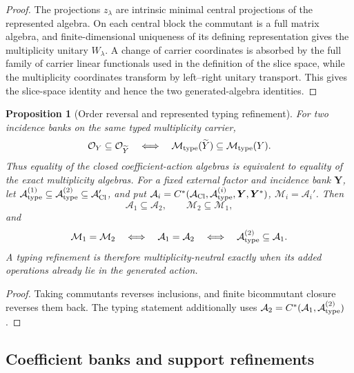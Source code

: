 \documentclass[11pt]{article}
\numberwithin{equation}{section}
\newtheorem{proposition}[theorem]{Proposition}
\theoremstyle{definition}
\theoremstyle{remark}
\newcommand{\A}{\mathcal A}
\newcommand{\M}{\mathcal M}
\newcommand{\Oalg}{\mathcal O}
\begin{document}
\begin{proof}
The projections $z_\lambda$ are intrinsic minimal central projections of the
represented algebra.  On each central block the commutant is a full matrix
algebra, and finite-dimensional uniqueness of its defining representation
gives the multiplicity unitary $W_\lambda$.  A change of carrier coordinates
is absorbed by the full family of carrier linear functionals used in the
definition of the slice space, while the multiplicity coordinates transform by
left--right unitary transport.  This gives the slice-space identity and hence
the two generated-algebra identities.
\end{proof}

\begin{proposition}[Order reversal and represented typing refinement]
\label{prop:typing-refinement}
For two incidence banks on the same typed multiplicity carrier,
\begin{equation}
 \Oalg_Y\subseteq\Oalg_{\widetilde Y}
 \quad\Longleftrightarrow\quad
 \M_{\rm type}(\widetilde Y)\subseteq\M_{\rm type}(Y).
 \label{eq:incidence-closure-galois}
\end{equation}
Thus equality of the closed coefficient-action algebras is equivalent to
equality of the exact multiplicity algebras.
For a fixed external factor and incidence bank $\bm Y$, let
$\A_{\rm type}^{(1)}\subseteq\A_{\rm type}^{(2)}\subseteq\A_{\rm Cl}'$,
and put $\A_i=C^*(\A_{\rm Cl},\A_{\rm type}^{(i)},\bm Y,\bm Y^*)$,
$\M_i=\A_i'$.  Then
\begin{equation}
 \A_1\subseteq\A_2,\qquad\M_2\subseteq\M_1,
 \label{eq:typing-refinement-monotone}
\end{equation}
and
\[
 \M_1=\M_2\quad\Longleftrightarrow\quad\A_1=\A_2
 \quad\Longleftrightarrow\quad\A_{\rm type}^{(2)}\subseteq\A_1.
\]
A typing refinement is therefore multiplicity-neutral exactly when its
added operations already lie in the generated action.
\end{proposition}
\begin{proof}
Taking commutants reverses inclusions, and finite bicommutant closure
reverses them back.  The typing statement additionally uses
$\A_2=C^*(\A_1,\A_{\rm type}^{(2)})$.
\end{proof}


\subsection{Coefficient banks and support refinements}
\label{app:coefficient-spaces}
\end{document}

